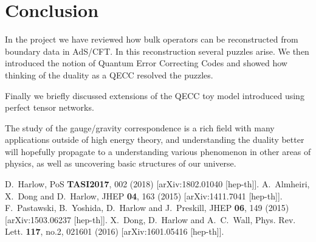 \documentclass[letter,12pt]{article}
\begin{document}
\section{Conclusion}
In the project we have reviewed how bulk operators can be reconstructed from boundary data in AdS/CFT. In this reconstruction several puzzles arise. We then introduced the notion of Quantum Error Correcting Codes and showed how thinking of the duality as a QECC resolved the puzzles.

Finally we briefly discussed extensions of the QECC toy model introduced using perfect tensor networks. 

The study of the gauge/gravity correspondence is a rich field with many applications outside of high energy theory, and understanding the duality better will hopefully propagate to a understanding various phenomenon in other areas of physics, as well as uncovering basic structures of our universe.
\newpage
\begin{thebibliography}{99}
	D.~Harlow,
	PoS \textbf{TASI2017}, 002 (2018)
	[arXiv:1802.01040 [hep-th]].
	A.~Almheiri, X.~Dong and D.~Harlow,
	JHEP \textbf{04}, 163 (2015)
	[arXiv:1411.7041 [hep-th]].
	F.~Pastawski, B.~Yoshida, D.~Harlow and J.~Preskill,
	JHEP \textbf{06}, 149 (2015)
	[arXiv:1503.06237 [hep-th]].
	X.~Dong, D.~Harlow and A.~C.~Wall,
	Phys. Rev. Lett. \textbf{117}, no.2, 021601 (2016)
	[arXiv:1601.05416 [hep-th]].
\end{thebibliography}
\end{document}
